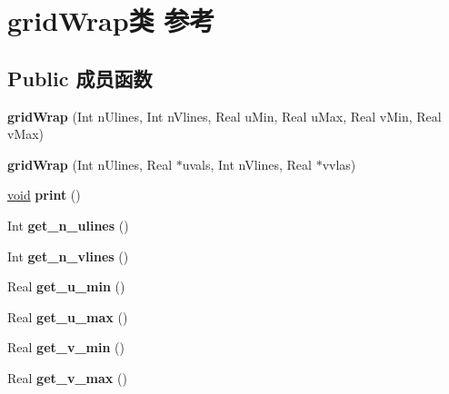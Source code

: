\hypertarget{classgrid_wrap}{}\section{grid\+Wrap类 参考}
\label{classgrid_wrap}
\subsection*{Public 成员函数}
\begin{DoxyCompactItemize}
\item 
\mbox{\label{classgrid_wrap_a4db555c5a9af34135ab5ac38f3ca8b99}} 
{\bfseries grid\+Wrap} (Int n\+Ulines, Int n\+Vlines, Real u\+Min, Real u\+Max, Real v\+Min, Real v\+Max)
\item 
\mbox{\label{classgrid_wrap_ac18396de17f0e705f17b9def892b00b4}} 
{\bfseries grid\+Wrap} (Int n\+Ulines, Real $\ast$uvals, Int n\+Vlines, Real $\ast$vvlas)
\item 
\mbox{\label{classgrid_wrap_a7e887a5067e4a83c6600fca6d3830c9d}} 
\hyperlink{interfacevoid}{void} {\bfseries print} ()
\item 
\mbox{\label{classgrid_wrap_afac315db2b25f95a5cfe1d2858d49b33}} 
Int {\bfseries get\+\_\+n\+\_\+ulines} ()
\item 
\mbox{\label{classgrid_wrap_a3fac55c7bb23b8dfc77674f903aad991}} 
Int {\bfseries get\+\_\+n\+\_\+vlines} ()
\item 
\mbox{\label{classgrid_wrap_a353f453badd269470091dac75289cfa3}} 
Real {\bfseries get\+\_\+u\+\_\+min} ()
\item 
\mbox{\label{classgrid_wrap_a8fc3d4594c69b64d1d8e63a5d0c8f74c}} 
Real {\bfseries get\+\_\+u\+\_\+max} ()
\item 
\mbox{\label{classgrid_wrap_aa7e620bded5c30827cabb397fdd56157}} 
Real {\bfseries get\+\_\+v\+\_\+min} ()
\item 
\mbox{\label{classgrid_wrap_a49aefc91358d6fedd1dd10d234ac266c}} 
Real {\bfseries get\+\_\+v\+\_\+max} ()
\item 

\end{DoxyCompactItemize}
